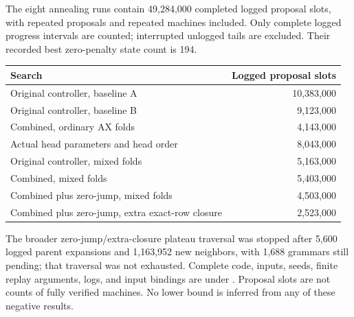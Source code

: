 The eight annealing runs contain 49,284,000 completed logged proposal
slots, with repeated proposals and repeated machines included. Only
complete logged progress intervals are counted; interrupted unlogged tails
are excluded. Their recorded best zero-penalty state count is 194.
\begin{center}\small
\begin{tabular}{@{}lr@{}}
\toprule Search & Logged proposal slots\\\midrule
Original controller, baseline A &10,383,000\\
Original controller, baseline B &9,123,000\\
Combined, ordinary AX folds &4,143,000\\
Actual head parameters and head order &8,043,000\\
Original controller, mixed folds &5,163,000\\
Combined, mixed folds &5,403,000\\
Combined plus zero-jump, mixed folds &4,503,000\\
Combined plus zero-jump, extra exact-row closure &2,523,000\\
\bottomrule
\end{tabular}
\end{center}
The broader zero-jump/extra-closure plateau traversal was stopped after
5,600 logged parent expansions and 1,163,952 new neighbors, with 1,688
grammars still pending; that traversal was not exhausted. Complete code,
inputs, seeds, finite replay arguments, logs, and input bindings are under
. Proposal slots are not counts of fully verified
machines. No lower bound is inferred from any of these negative results.
